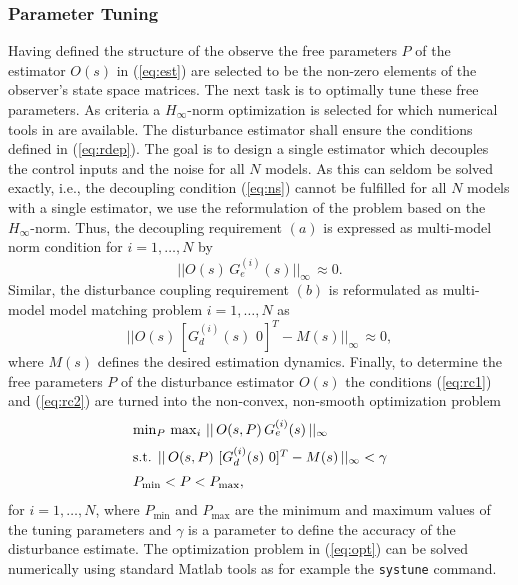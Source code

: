 \documentclass[graybox]{svmult}
\begin{document}
\subsubsection{Parameter Tuning}\label{sec:tuning}\vspace{-1mm}
Having defined the structure of the observe  the free parameters $P$ of the estimator $O(s)$ in (\ref{eq:est}) are selected to be the non-zero elements of the observer's state space matrices. The next task is to optimally tune these free parameters. As criteria a $H_\infty$-norm optimization is selected for which numerical tools in \matlab are available. The disturbance estimator shall ensure the conditions defined in (\ref{eq:rdep}). The goal is to design a single estimator which decouples the control inputs and the noise for all $N$ models. As this can seldom be solved exactly, i.e., the decoupling condition (\ref{eq:ns}) cannot be fulfilled for all $N$ models with a single estimator, we use the reformulation of the problem based on the $H_\infty$-norm. Thus, the decoupling requirement $(a)$ is expressed as  multi-model norm condition for  $i=1,\dots,N$ by
\begin{equation}\label{eq:rc1}
||O(s) \, G_e^{(i)}(s) ||_\infty  \,\approx 0.
\end{equation}
Similar, the disturbance coupling requirement $(b)$ is reformulated as multi-model model matching problem  $i=1,\dots,N$ as
\begin{equation}\label{eq:rc2}
|| O(s) \, [ G_d^{(i)}(s) \,\, 0 ]^T - M(s) ||_\infty \,\approx 0,
\end{equation}
where $M(s)$ defines the desired estimation dynamics. Finally, to determine the free parameters $P$ of the disturbance estimator $O(s)$ the conditions (\ref{eq:rc1}) and (\ref{eq:rc2}) are turned into the non-convex, non-smooth optimization problem
\begin{equation} \label{eq:opt}
\begin{array}{l}
\min_{P} \, \max_{i} \, || \, O(s,P) \, G_e^{(i)}(s) \, ||_\infty \vspace{+2mm} \\
\textnormal{s.t. } ||\, O(s,P) \,\, [ G_d^{(i)}(s) \,\, 0 ]^T - M(s) \, ||_\infty < \gamma \vspace{+2mm} \\
P_{\min} < P < P_{\max},
\end{array}
\end{equation}
for $i=1,\dots,N$, where $P_{\min}$ and $P_{\max}$ are the minimum and maximum values of the tuning parameters and $\gamma$ is a parameter to define the accuracy of the disturbance estimate. The optimization problem in (\ref{eq:opt}) can be  solved numerically using standard Matlab tools as for example the \texttt{systune} command.
 
\end{document}
